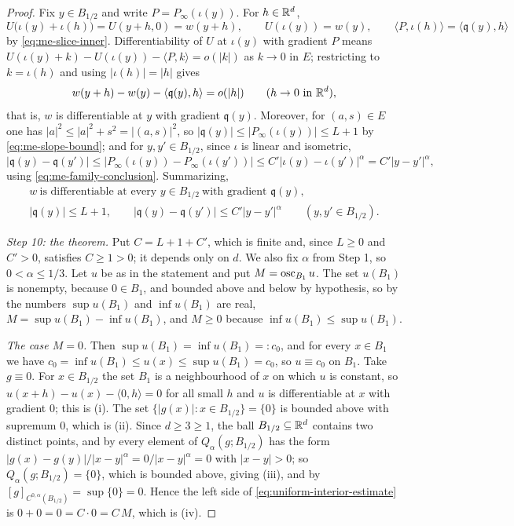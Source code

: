 \begin{proof}
Fix $y\in B_{1/2}$ and write $P=P_\infty(\iota(y))$. For $h\in\mathbb{R}^d$,
\[
  U\bigl(\iota(y)+\iota(h)\bigr)=U(y+h,0)=w(y+h),\qquad
  U(\iota(y))=w(y),\qquad
  \langle P,\iota(h)\rangle=\langle\mathfrak q(y),h\rangle
\]
by \eqref{eq:me-slice-inner}. Differentiability of $U$ at $\iota(y)$ with
gradient $P$ means
$U(\iota(y)+k)-U(\iota(y))-\langle P,k\rangle=o(|k|)$ as $k\to0$ in $E$;
restricting to $k=\iota(h)$ and using $|\iota(h)|=|h|$ gives
\[
  w(y+h)-w(y)-\langle\mathfrak q(y),h\rangle=o(|h|)\qquad(h\to0\ \text{in }\mathbb{R}^d),
\]
that is, $w$ is differentiable at $y$ with gradient $\mathfrak q(y)$. Moreover,
for $(a,s)\in E$ one has $|a|^2\le|a|^2+s^2=|(a,s)|^2$, so
$|\mathfrak q(y)|\le|P_\infty(\iota(y))|\le L+1$ by \eqref{eq:me-slope-bound};
and for $y,y'\in B_{1/2}$, since $\iota$ is linear and isometric,
\[
  |\mathfrak q(y)-\mathfrak q(y')|
   \le\bigl|P_\infty(\iota(y))-P_\infty(\iota(y'))\bigr|
   \le C'\bigl|\iota(y)-\iota(y')\bigr|^\alpha=C'|y-y'|^\alpha ,
\]
using \eqref{eq:me-family-conclusion}. Summarizing,
\begin{equation}\label{eq:me-normalized-conclusion}
\begin{gathered}
  w\ \text{is differentiable at every }y\in B_{1/2}\ \text{with gradient }
  \mathfrak q(y),\\
  |\mathfrak q(y)|\le L+1,\qquad
  |\mathfrak q(y)-\mathfrak q(y')|\le C'|y-y'|^\alpha
  \qquad(y,y'\in B_{1/2}).
\end{gathered}
\end{equation}

\emph{Step 10: the theorem.}
Put $C=L+1+C'$, which is finite and, since $L\ge0$ and $C'>0$, satisfies
$C\ge1>0$; it depends only on $d$. We also fix $\alpha$ from Step 1, so
$0<\alpha\le1/3$. Let $u$ be as in the statement and put
$M=\operatorname{osc}_{B_1}u$. The set $u(B_1)$ is nonempty, because $0\in B_1$, and bounded
above and below by hypothesis, so by  the numbers
$\sup u(B_1)$ and $\inf u(B_1)$ are real, $M=\sup u(B_1)-\inf u(B_1)$, and
$M\ge0$ because $\inf u(B_1)\le\sup u(B_1)$.

\emph{The case $M=0$.} Then $\sup u(B_1)=\inf u(B_1)=:c_0$, and for every
$x\in B_1$ we have $c_0=\inf u(B_1)\le u(x)\le\sup u(B_1)=c_0$, so $u\equiv c_0$
on $B_1$. Take $g\equiv0$. For $x\in B_{1/2}$ the set $B_1$ is a neighbourhood
of $x$ on which $u$ is constant, so
$u(x+h)-u(x)-\langle0,h\rangle=0$ for all small $h$ and $u$ is differentiable at
$x$ with gradient $0$; this is (i). The set $\{|g(x)|:x\in B_{1/2}\}=\{0\}$ is
bounded above with supremum $0$, which is (ii). Since $d\ge3\ge1$, the ball
$B_{1/2}\subseteq\mathbb{R}^d$ contains two distinct points, and by
 every element of $Q_\alpha(g;B_{1/2})$ has the form
$|g(x)-g(y)|/|x-y|^\alpha=0/|x-y|^\alpha=0$ with $|x-y|>0$; so
$Q_\alpha(g;B_{1/2})=\{0\}$, which is bounded above, giving (iii), and by
 $[g]_{C^{0,\alpha}(B_{1/2})}=\sup\{0\}=0$. Hence the
left side of \eqref{eq:uniform-interior-estimate} is $0+0=0=C\cdot0=C\,M$, which
is (iv).


\end{proof}
